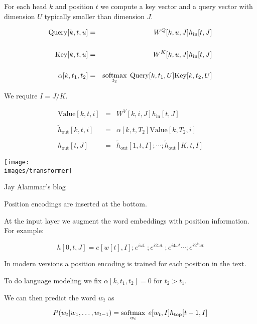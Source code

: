 {

For each head $k$ and position $t$ we compute a key vector and a query vector with dimension $U$ typically smaller than dimension $J$.
      
\begin{eqnarray*}
\mathrm{Query}[k,t,u] & = & W^Q[k,u,J]h_\mathrm{in}[t,J] \\
\\
\mathrm{Key}[k,t,u] & = &  W^K[k,u,J]h_\mathrm{in}[t,J] \\
\\
\alpha[k,t_1,t_2] & = & \operatorname*{softmax}_{t_2}\; \mathrm{Query}[k,t_1,U]\mathrm{Key}[k,t_2,U]
\end{eqnarray*}


We require $I = J/K$.
      
\begin{eqnarray*}
\mathrm{Value}[k,t,i] & = & W^V[k,i,J]h_\mathrm{in}[t,J] \\
\\
\tilde{h}_\mathrm{out}[k,t,i] & = & \alpha[k,t,T_2]\mathrm{Value}[k,T_2,i] \\
\\
h_\mathrm{out}[t,J] & = & \tilde{h}_\mathrm{out}[1,t,I];\cdots;\tilde{h}_\mathrm{out}[K,t,I]
\end{eqnarray*}


\centerline{\texttt{[image: \\images/transformer]}}

{\huge
\centerline{Jay Alammar's blog}
}

Position encodings are inserted at the bottom.


At the input layer we augment the word embeddings with position information. For example:

\vfill
{\color{red} $$h[0,t,J] = e[w[t],I];e^{i\omega t}\;;e^{i2\omega t}\;;e^{i4\omega t}\cdots;e^{i2^k\omega t}$$}

\vfill
In modern versions a position encoding is trained for each position in the text.


To do language modeling we fix $\alpha[k,t_1,t_2] = 0$ for $t_2 > t_1$.

\vfill
We can then predict the word $w_t$ as

\vfill
$$P(w_t|w_1,\ldots,w_{t-1}) = \operatorname*{softmax}_{w_t}\;e[w_t,I]h_\mathrm{top}[t-1,I]$$

}
